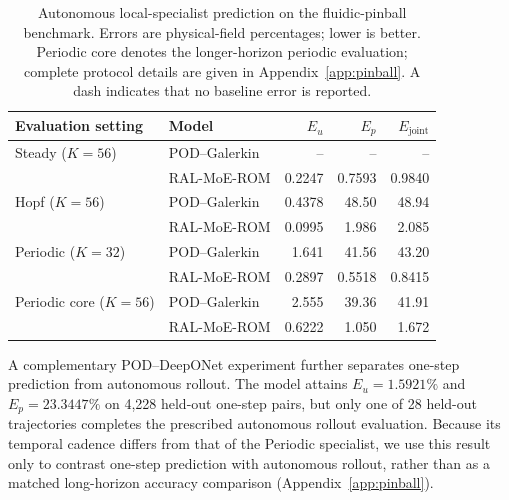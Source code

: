 \begin{table}[htbp]
\centering
\caption{
Autonomous local-specialist prediction on the fluidic-pinball benchmark. Errors are physical-field percentages; lower is better. Periodic core denotes the longer-horizon periodic evaluation; complete protocol details are given in Appendix~\ref{app:pinball}. A dash indicates that no baseline error is reported.
}
\label{tab:pinball_autonomous}
\small
\setlength{\tabcolsep}{5pt}
\begin{tabular}{@{}llrrr@{}}
\toprule
Evaluation setting & Model & $E_u$ & $E_p$ & $E_{\mathrm{joint}}$ \\
\midrule
Steady ($K=56$)
& POD--Galerkin
& -- & -- & -- \\
& RAL-MoE-ROM
& 0.2247 & 0.7593 & 0.9840 \\
\addlinespace

Hopf ($K=56$)
& POD--Galerkin
& 0.4378 & 48.50 & 48.94 \\
& RAL-MoE-ROM
& 0.0995 & 1.986 & 2.085 \\
\addlinespace

Periodic ($K=32$)
& POD--Galerkin
& 1.641 & 41.56 & 43.20 \\
& RAL-MoE-ROM
& 0.2897 & 0.5518 & 0.8415 \\
\addlinespace

Periodic core ($K=56$)
& POD--Galerkin
& 2.555 & 39.36 & 41.91 \\
& RAL-MoE-ROM
& 0.6222 & 1.050 & 1.672 \\
\bottomrule
\end{tabular}
\end{table}

A complementary POD--DeepONet experiment further separates one-step prediction from autonomous rollout.
The model attains $E_u=1.5921\%$ and $E_p=23.3447\%$ on 4,228 held-out one-step pairs, but only one of 28 held-out trajectories completes the prescribed autonomous rollout evaluation. Because its temporal cadence differs from that of the Periodic specialist, we use this result only to contrast one-step prediction with autonomous rollout, rather than as a matched long-horizon accuracy comparison (Appendix~\ref{app:pinball}).





